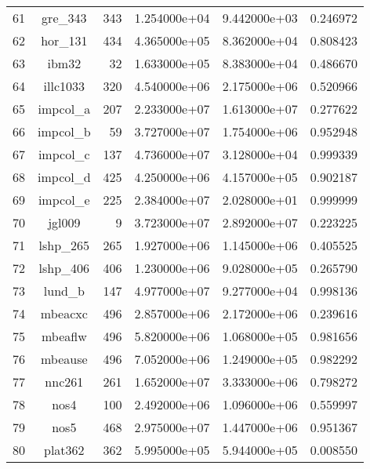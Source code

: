 \documentclass[8pt]{report}
\begin{document}
\begin{table*}
\begin{tabular}{|l|c|r|r|r|r|}
61  &                  gre\_343 &   343 &  1.254000e+04 &  9.442000e+03 &  0.246972 \\
62  &                  hor\_131 &   434 &  4.365000e+05 &  8.362000e+04 &  0.808423 \\
63  &                    ibm32 &    32 &  1.633000e+05 &  8.383000e+04 &  0.486670 \\
64  &                 illc1033 &   320 &  4.540000e+06 &  2.175000e+06 &  0.520966 \\
65  &                 impcol\_a &   207 &  2.233000e+07 &  1.613000e+07 &  0.277622 \\
66  &                 impcol\_b &    59 &  3.727000e+07 &  1.754000e+06 &  0.952948 \\
67  &                 impcol\_c &   137 &  4.736000e+07 &  3.128000e+04 &  0.999339 \\
68  &                 impcol\_d &   425 &  4.250000e+06 &  4.157000e+05 &  0.902187 \\
69  &                 impcol\_e &   225 &  2.384000e+07 &  2.028000e+01 &  0.999999 \\
70  &                   jgl009 &     9 &  3.723000e+07 &  2.892000e+07 &  0.223225 \\
71  &                 lshp\_265 &   265 &  1.927000e+06 &  1.145000e+06 &  0.405525 \\
72  &                 lshp\_406 &   406 &  1.230000e+06 &  9.028000e+05 &  0.265790 \\
73  &                   lund\_b &   147 &  4.977000e+07 &  9.277000e+04 &  0.998136 \\
74  &                  mbeacxc &   496 &  2.857000e+06 &  2.172000e+06 &  0.239616 \\
75  &                  mbeaflw &   496 &  5.820000e+06 &  1.068000e+05 &  0.981656 \\
76  &                  mbeause &   496 &  7.052000e+06 &  1.249000e+05 &  0.982292 \\
77  &                   nnc261 &   261 &  1.652000e+07 &  3.333000e+06 &  0.798272 \\
78  &                     nos4 &   100 &  2.492000e+06 &  1.096000e+06 &  0.559997 \\
79  &                     nos5 &   468 &  2.975000e+07 &  1.447000e+06 &  0.951367 \\
80  &                  plat362 &   362 &  5.995000e+05 &  5.944000e+05 &  0.008550 \\
\bottomrule
\end{tabular}
\end{table*}
\end{document}
